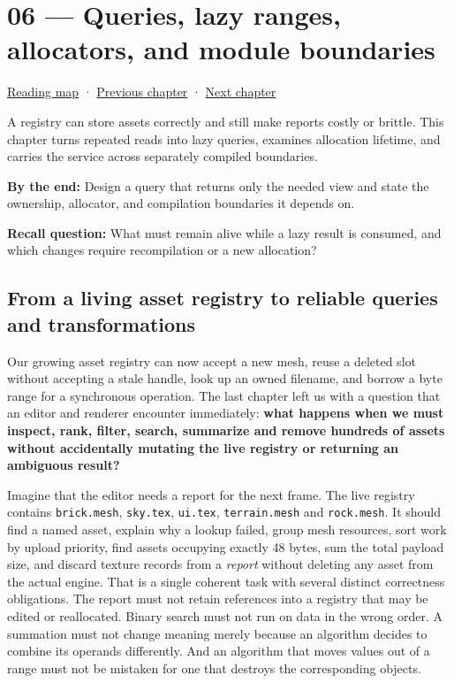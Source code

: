 \hypertarget{05-engine-i-ch006}{}
\chapter{06 --- Queries, lazy ranges, allocators, and module boundaries}\label{05-engine-i-ch006-queries-lazy-ranges-allocators-and-module-boundaries}

\hyperref[volume-reading-map]{Reading map} · \hyperref[05-engine-i-ch005]{Previous chapter} · \hyperref[05-engine-i-ch007]{Next chapter}

A registry can store assets correctly and still make reports costly or brittle. This chapter turns repeated reads into lazy queries, examines allocation lifetime, and carries the service across separately compiled boundaries.

\textbf{By the end:} Design a query that returns only the needed view and state the ownership, allocator, and compilation boundaries it depends on.

\textbf{Recall question:} What must remain alive while a lazy result is consumed, and which changes require recompilation or a new allocation?

\section{From a living asset registry to reliable queries and transformations}\label{05-engine-i-ch006-from-a-living-asset-registry-to-reliable-queries-and-transformations}

Our growing asset registry can now accept a new mesh, reuse a deleted slot without accepting a stale handle, look up an owned filename, and borrow a byte range for a synchronous operation. The last chapter left us with a question that an editor and renderer encounter immediately: \textbf{what happens when we must inspect, rank, filter, search, summarize and remove hundreds of assets without accidentally mutating the live registry or returning an ambiguous result?}

Imagine that the editor needs a report for the next frame. The live registry contains \texttt{brick.mesh}, \texttt{sky.tex}, \texttt{ui.tex}, \texttt{terrain.mesh} and \texttt{rock.mesh}. It should find a named asset, explain why a lookup failed, group mesh resources, sort work by upload priority, find assets occupying exactly 48 bytes, sum the total payload size, and discard texture records from a \emph{report} without deleting any asset from the actual engine. That is a single coherent task with several distinct correctness obligations. The report must not retain references into a registry that may be edited or reallocated. Binary search must not run on data in the wrong order. A summation must not change meaning merely because an algorithm decides to combine its operands differently. And an algorithm that moves values out of a range must not be mistaken for one that destroys the corresponding objects.

